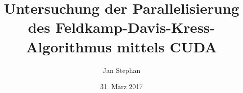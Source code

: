 \documentclass[utf8,german,beleg]{zihpub}
\author{Jan Stephan}
\title{Untersuchung der Parallelisierung des Feldkamp-Davis-Kress-Algorithmus mittels CUDA{\textregistered}}
\date{31. März 2017}
\begin{document}
\printglossaries
\listoffigures
\listoflistings
\listoftables







\end{document}
